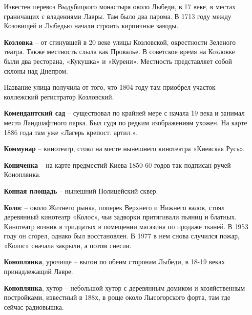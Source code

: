 Известен перевоз Выдубицкого монастыря около Лыбеди, в 17 веке, в местах граничащих с владениями Лавры. Там было два парома. В 1713 году между Козовищей и Лыбедью начали строить кирпичные заводы.\\

\medskip


\textbf{Козловка} – от сгинувшей в 20 веке улицы Козловской, окрестности Зеленого театра. Также местность слыла как Провалье. В советское время на Козловке были два ресторана, «Кукушка» и «Курени». Местность представляет собой склоны над Днепром.

Название улица получила от того, что 1804 году там приобрел участок коллежский регистратор Козловский.\\

\medskip

\textbf{Комендантский сад} – существовал по крайней мере с начала 19 века и занимал место Ландшафтного парка. Был судя по редким изображениям ухожен. На карте 1886 года там уже «Лагерь крепост. артил.».\\

\medskip


\textbf{Коммунар} – кинотеатр, стоял на месте нынешнего кинотеатра «Киевская Русь».\\

\medskip


\textbf{Кониченка} – на карте предместий Киева 1850-60 годов так подписан ручей Коноплянка.\\

\medskip

\textbf{Конная площадь} – нынешний Полицейский сквер.\\

\medskip

\textbf{Колос} – около Житнего рынка, поперек Верхнего и Нижнего валов, стоял деревянный кинотеатр «Колос», чьи задворки притягивали пьяниц и блатных. Кинотеатр возник в тридцатых в помещении магазина по продаже тканей. В 1953 году он сгорел, однако был восстановлен. В 1977 в нем снова случился пожар, «Колос» сначала закрыли, а потом снесли.\\

\medskip

\textbf{Коноплянка}, урочище – выгон по обеим сторонам Лыбеди, в 18-19 веках принадлежащий Лавре.\\

\medskip

\textbf{Коноплянка}, хутор – небольшой хутор с деревянным домиком и хозяйственным постройками, известный в 188х, в роще около Лысогорского форта, там где сейчас радиовышка.\\  

